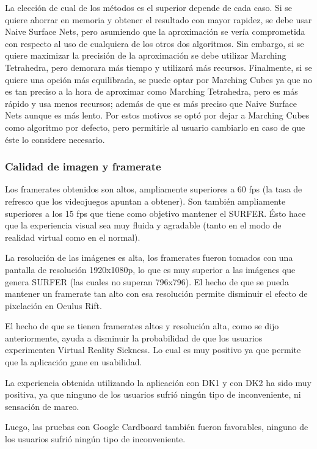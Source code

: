 \documentclass[12pt]{article}
\begin{document}
La elección de cual de los métodos es el superior depende de cada caso. Si se quiere ahorrar en memoria y obtener el resultado con mayor rapidez, se debe usar Naive Surface Nets, pero asumiendo que la aproximación se vería comprometida con respecto al uso de cualquiera de los otros dos algoritmos. Sin embargo, si se quiere maximizar la precisión de la aproximación se debe utilizar Marching Tetrahedra, pero demorara más tiempo y utilizará más recursos. Finalmente, si se quiere una opción más equilibrada, se puede optar por Marching Cubes ya que no es tan preciso a la hora de aproximar como Marching Tetrahedra, pero es más rápido y usa menos recursos; además de que es más preciso que Naive Surface Nets aunque es más lento. Por estos motivos se optó por dejar a Marching Cubes como algoritmo por defecto, pero permitirle al usuario cambiarlo en caso de que éste lo considere necesario.

\subsubsection{Calidad de imagen y framerate}
\noindent Los framerates obtenidos son altos, ampliamente superiores a 60 fps (la tasa de refresco que los videojuegos apuntan a obtener). Son también ampliamente superiores a los 15 fps que tiene como objetivo mantener el SURFER. Ésto hace que la experiencia visual sea muy fluida y agradable (tanto en el modo de realidad virtual como en el normal). 

La resolución de las imágenes es alta, los framerates fueron tomados con una pantalla de resolución 1920x1080p, lo que es muy superior a las imágenes que genera SURFER (las cuales no superan 796x796). El hecho de que se pueda mantener un framerate tan alto con esa resolución permite disminuir el efecto de pixelación en Oculus Rift. 

El hecho de que se tienen framerates altos y resolución alta, como se dijo anteriormente, ayuda a disminuir la probabilidad de que los usuarios experimenten Virtual Reality Sickness. Lo cual es muy positivo ya que permite que la aplicación gane en usabilidad.

La experiencia obtenida utilizando la aplicación con DK1 y con DK2 ha sido muy positiva, ya que ninguno de los usuarios sufrió ningún tipo de inconveniente, ni sensación de mareo. 

Luego, las pruebas con Google Cardboard también fueron favorables, ninguno de los usuarios sufrió ningún tipo de inconveniente.
\end{document}
